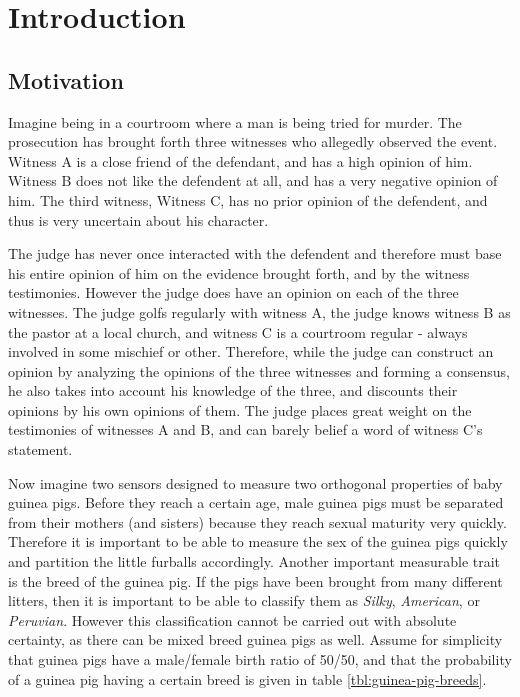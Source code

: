 \documentclass[thesis.tex]{subfiles}
\begin{document}
\chapter{Introduction}



\section{Motivation}

Imagine being in a courtroom where a man is being tried for murder. The prosecution has
brought forth three witnesses who allegedly observed the event. Witness A is a close friend
of the defendant, and has a high opinion of him. Witness B does not like the defendent at
all, and has a very negative opinion of him. The third witness, Witness C, has no prior
opinion of the defendent, and thus is very uncertain about his character.

The judge has never once interacted with the defendent and therefore must base his entire
opinion of him on the evidence brought forth, and by the witness testimonies. However the
judge does have an opinion on each of the three witnesses. The judge golfs regularly with
witness A, the judge knows witness B as the pastor at a local church, and witness C is a
courtroom regular - always involved in some mischief or other. Therefore, while the judge
can construct an opinion by analyzing the opinions of the three witnesses and forming a
consensus, he also takes into account his knowledge of the three, and discounts their
opinions by his own opinions of them. The judge places great weight on the testimonies of
witnesses A and B, and can barely belief a word of witness C's statement.

Now imagine two sensors designed to measure two orthogonal properties of baby guinea pigs.
Before they reach a certain age, male guinea pigs must be separated from their mothers
(and sisters) because they reach sexual maturity very quickly. Therefore it is important to
be able to measure the sex of the guinea pigs quickly and partition the little furballs
accordingly. Another important measurable trait is the breed of the guinea pig. If the
pigs have been brought from many different litters, then it is important to be able to
classify them as \emph{Silky}, \emph{American}, or \emph{Peruvian}. However this classification
cannot be carried out with absolute certainty, as there can be mixed breed guinea pigs as well.
Assume for simplicity that guinea pigs have a male/female birth ratio of 50/50, and that the
probability of a guinea pig having a certain breed is given in table \ref{tbl:guinea-pig-breeds}.
\end{document}
